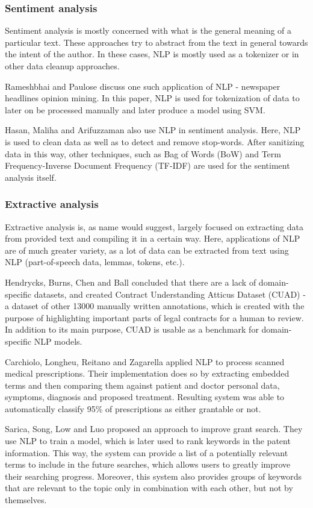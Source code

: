 \subsubsection{Sentiment analysis}
Sentiment analysis is mostly concerned with what is the general meaning of a particular text. These approaches try to abstract from the text in general towards the intent of the author. In these cases, NLP is mostly used as a tokenizer or in other data cleanup approaches.

Rameshbhai and Paulose \cite{lr-5} discuss one such application of NLP - newspaper headlines opinion mining. In this paper, NLP is used for tokenization of data to later on be processed manually and later produce a model using SVM.

Hasan, Maliha and Arifuzzaman \cite{lr-6} also use NLP in sentiment analysis. Here, NLP is used to clean data as well as to detect and remove stop-words. After sanitizing data in this way, other techniques, such as Bag of Words (BoW) and Term Frequency-Inverse Document Frequency (TF-IDF) are used for the sentiment analysis itself.

\subsubsection{Extractive analysis}
Extractive analysis is, as name would suggest, largely focused on extracting data from provided text and compiling it in a certain way. Here, applications of NLP are of much greater variety, as a lot of data can be extracted from text using NLP (part-of-speech data, lemmas, tokens, etc.).

Hendrycks, Burns, Chen and Ball \cite{lr-7} concluded that there are a lack of domain-specific datasets, and created Contract Understanding Atticus Dataset (CUAD) - a dataset of other 13000 manually written annotations, which is created with the purpose of highlighting important parts of legal contracts for a human to review. In addition to its main purpose, CUAD is usable as a benchmark for domain-specific NLP models.

Carchiolo, Longheu, Reitano and Zagarella \cite{lr-8} applied NLP to process scanned medical prescriptions. Their implementation does so by extracting embedded terms and then comparing them against patient and doctor personal data, symptoms, diagnosis and proposed treatment. Resulting system was able to automatically classify 95\% of prescriptions as either grantable or not.

Sarica, Song, Low and Luo \cite{lr-9} proposed an approach to improve grant search. They use NLP to train a model, which is later used to rank keywords in the patent information. This way, the system can provide a list of a potentially relevant terms to include in the future searches, which allows users to greatly improve their searching progress. Moreover, this system also provides groups of keywords that are relevant to the topic only in combination with each other, but not by themselves.

